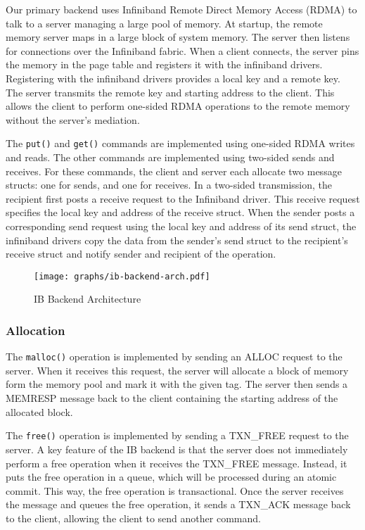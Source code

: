 Our primary backend uses Infiniband Remote Direct Memory Access (RDMA) to talk
to a server managing a large pool of memory. At startup, the remote memory
server maps in a large block of system memory. The server then listens for
connections over the Infiniband fabric. When a client connects, the server
pins the memory in the page table and registers it with the infiniband drivers.
Registering with the infiniband drivers provides a local key and a remote key.
The server transmits the remote key and starting address to the client.
This allows the client to perform one-sided RDMA operations to the remote
memory without the server's mediation.

The \texttt{put()} and \texttt{get()} commands are implemented using one-sided
RDMA writes and reads. The other commands are implemented using two-sided sends
and receives. For these commands, the client and server each allocate two
message structs: one for sends, and one for receives. In a two-sided
transmission, the recipient first posts a receive request to the Infiniband
driver. This receive request specifies the local key and address of the receive
struct. When the sender posts a corresponding send request using the local key
and address of its send struct, the infiniband drivers copy the data from the
sender's send struct to the recipient's receive struct and notify sender and
recipient of the operation.

\begin{figure}
    \texttt{[image: graphs/ib-backend-arch.pdf]}
    \caption{IB Backend Architecture}
    \label{fig:ib-backend-arch}
\end{figure}

\subsubsection{Allocation}

The \texttt{malloc()} operation is implemented by sending an ALLOC request to
the server. When it receives this request, the server will allocate a block of
memory form the memory pool and mark it with the given tag.  The server then
sends a MEMRESP message back to the client containing the starting address of
the allocated block.

The \texttt{free()} operation is implemented by sending a TXN\_FREE request to
the server. A key feature of the IB backend is that the server does not
immediately perform a free operation when it receives the TXN\_FREE message.
Instead, it puts the free operation in a queue, which will be processed during
an atomic commit. This way, the free operation is transactional. Once the
server receives the message and queues the free operation, it sends a TXN\_ACK
message back to the client, allowing the client to send another command.


